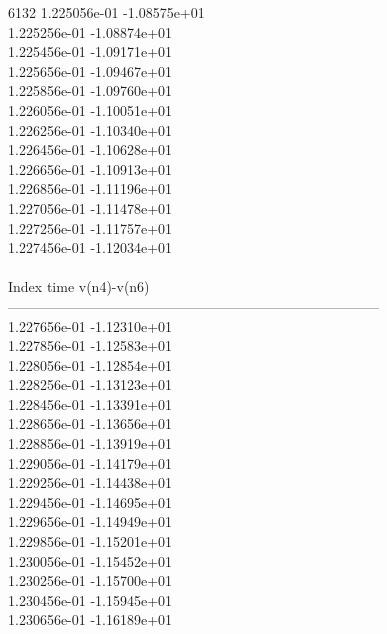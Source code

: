 6132	1.225056e-01	-1.08575e+01	\\ 	1.225256e-01	-1.08874e+01	\\ 	1.225456e-01	-1.09171e+01	\\ 	1.225656e-01	-1.09467e+01	\\ 	1.225856e-01	-1.09760e+01	\\ 	1.226056e-01	-1.10051e+01	\\ 	1.226256e-01	-1.10340e+01	\\ 	1.226456e-01	-1.10628e+01	\\ 	1.226656e-01	-1.10913e+01	\\ 	1.226856e-01	-1.11196e+01	\\ 	1.227056e-01	-1.11478e+01	\\ 	1.227256e-01	-1.11757e+01	\\ 	1.227456e-01	-1.12034e+01	\\ \hline
\\ \hline
Index   time            v(n4)-v(n6)     \\ \hline
--------------------------------------------------------------------------------\\ 	1.227656e-01	-1.12310e+01	\\ 	1.227856e-01	-1.12583e+01	\\ 	1.228056e-01	-1.12854e+01	\\ 	1.228256e-01	-1.13123e+01	\\ 	1.228456e-01	-1.13391e+01	\\ 	1.228656e-01	-1.13656e+01	\\ 	1.228856e-01	-1.13919e+01	\\ 	1.229056e-01	-1.14179e+01	\\ 	1.229256e-01	-1.14438e+01	\\ 	1.229456e-01	-1.14695e+01	\\ 	1.229656e-01	-1.14949e+01	\\ 	1.229856e-01	-1.15201e+01	\\ 	1.230056e-01	-1.15452e+01	\\ 	1.230256e-01	-1.15700e+01	\\ 	1.230456e-01	-1.15945e+01	\\ 	1.230656e-01	-1.16189e+01	\\ \hline
